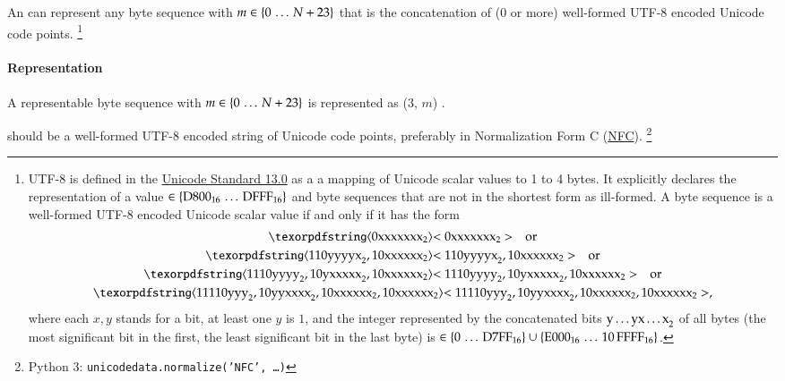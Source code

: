An \DborUtfEightStringValue{} can represent any byte sequence 
with $m \in \{0 \,\ldots\, N + 23\}$ that is the concatenation of ($0$ or more)
well-formed UTF-8 encoded Unicode code points.%
\footnote{
    UTF-8 is defined in the
    \href{https://www.unicode.org/versions/Unicode13.0.0/ch03.pdf\#G31703}{Unicode Standard 13.0}
    as a a mapping of Unicode scalar values to 1 to 4 bytes.
    It explicitly declares the representation of a value $\in \{\mathrm{D800}_{16} \,\ldots\, \mathrm{DFFF}_{16}\}$
    and byte sequences that are not in the shortest form as ill-formed.
    A byte sequence  is a well-formed UTF-8 encoded Unicode scalar value if and
    only if it has the form
    \begin{gather*}
        \ByteSequence{\BinNumber{0xxxxxxx}} \quad\text{or} \\
        \ByteSequence{\BinNumber{110yyyyx}, \BinNumber{10xxxxxx}} \quad\text{or} \\
        \ByteSequence{\BinNumber{1110yyyy}, \BinNumber{10yxxxxx}, \BinNumber{10xxxxxx}} \quad\text{or} \\
        \ByteSequence{\BinNumber{11110yyy}, \BinNumber{10yyxxxx}, \BinNumber{10xxxxxx}, \BinNumber{10xxxxxx}},
    \end{gather*}
    where each $x, y$ stands for a bit, at least one $y$ is $1$, and the integer represented by
    the concatenated bits $\mathrm{y \ldots y x \ldots x}_{2}$ of all bytes
    (the most significant bit in the first, the least significant bit in the last byte) is
    $\in \{0 \,\ldots\, \mathrm{D7FF}_{16}\} \cup \{\mathrm{E000}_{16} \,\ldots\, \mathrm{10\,FFFF}_{16}\}$.
}

\paragraph{Representation}

A representable byte sequence  with $m \in \{0 \,\ldots\, N + 23\}$
is represented as \DborIntegerToken*($3$, $m$) {\Concat} .

 should be a well-formed UTF-8 encoded string of Unicode code points,
preferably in Normalization Form C (\href{https://www.unicode.org/versions/Unicode13.0.0/ch03.pdf\#G31703}{NFC}).%
\footnote{
    Python 3: \texttt{unicodedata.normalize('NFC', \dots)}
}

